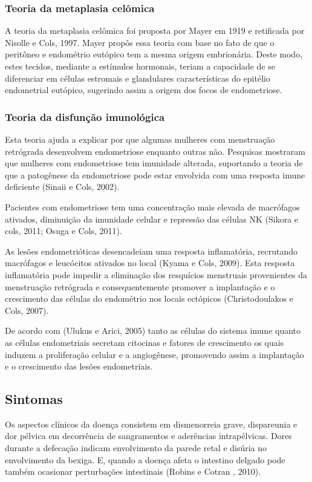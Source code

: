 \documentclass[12pt]{article} %
\begin{document}
\subsubsection{Teoria da metaplasia celômica}

A teoria da metaplasia celômica foi proposta por Mayer em 1919 e
retificada por Nisolle e Cols, 1997. Mayer propôs essa teoria com base
no fato de que o peritôneo e endométrio eutópico tem a mesma origem
embrionária. Deste modo, estes tecidos, mediante a estímulos
hormonais, teriam a capacidade de se diferenciar em células estromais
e glandulares características do epitélio endometrial eutópico,
sugerindo assim a origem dos focos de endometriose.

\subsubsection{Teoria da disfunção imunológica}

Esta teoria ajuda a explicar por que algumas mulheres com menstruação
retrógrada desenvolvem endometriose enquanto outras não. Pesquisas
mostraram que mulheres com endometriose tem imunidade alterada,
suportando a teoria de que a patogênese da endometriose pode estar
envolvida com uma resposta imune deficiente (Sinaii e Cols, 2002).

Pacientes com endometriose tem uma concentração mais elevada de
macrófagos ativados, diminuição da imunidade celular e repressão das
células NK (Sikora e cols, 2011; Osuga e Cols, 2011).

As lesões endometrióticas desencadeiam uma resposta inflamatória,
recrutando macrófagos e leucócitos ativados no local (Kyama e Cols,
2009). Esta resposta inflamatória pode impedir a eliminação dos
resquícios menstruais provenientes da menstruação retrógrada e
consequentemente promover a implantação e o crescimento das células do
endométrio nos locais ectópicos (Christodoulakos e Cols, 2007).

De acordo com (Ulukus e Arici, 2005) tanto as células do sistema imune
quanto as células endometriais secretam citocinas e fatores de
crescimento os quais induzem a proliferação celular e a angiogênese,
promovendo assim a implantação e o crescimento das lesões
endometriais.

\subsection{Sintomas} 

Os aspectos clínicos da doença consistem em dismenorreia grave,
dispareunia e dor pélvica em decorrência de sangramentos e aderências
intrapélvicas. Dores durante a defecação indicam envolvimento da
parede retal e disúria no envolvimento da bexiga. E, quando a doença
afeta o intestino delgado pode também ocasionar perturbações
intestinais (Robins e Cotran , 2010).
\end{document}

